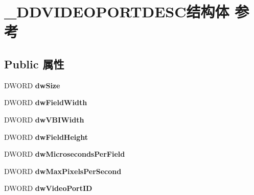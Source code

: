 \hypertarget{struct___d_d_v_i_d_e_o_p_o_r_t_d_e_s_c}{}\section{\+\_\+\+D\+D\+V\+I\+D\+E\+O\+P\+O\+R\+T\+D\+E\+S\+C结构体 参考}
\label{struct___d_d_v_i_d_e_o_p_o_r_t_d_e_s_c}
\subsection*{Public 属性}
\begin{DoxyCompactItemize}
\item 
\mbox{\label{struct___d_d_v_i_d_e_o_p_o_r_t_d_e_s_c_ac59e7cb8099622781997510317090967}} 
D\+W\+O\+RD {\bfseries dw\+Size}
\item 
\mbox{\label{struct___d_d_v_i_d_e_o_p_o_r_t_d_e_s_c_a595eb41cd183ead723af3d286215ecae}} 
D\+W\+O\+RD {\bfseries dw\+Field\+Width}
\item 
\mbox{\label{struct___d_d_v_i_d_e_o_p_o_r_t_d_e_s_c_a688c2db72c38887977ef242b1250432c}} 
D\+W\+O\+RD {\bfseries dw\+V\+B\+I\+Width}
\item 
\mbox{\label{struct___d_d_v_i_d_e_o_p_o_r_t_d_e_s_c_a88f8620f6f0a5478de5e882bf8b4d0b7}} 
D\+W\+O\+RD {\bfseries dw\+Field\+Height}
\item 
\mbox{\label{struct___d_d_v_i_d_e_o_p_o_r_t_d_e_s_c_aad4ed71b4084f495e91a0d44cbbfb12a}} 
D\+W\+O\+RD {\bfseries dw\+Microseconds\+Per\+Field}
\item 
\mbox{\label{struct___d_d_v_i_d_e_o_p_o_r_t_d_e_s_c_aaac1ee5d457bf84eaaaf21c590e08674}} 
D\+W\+O\+RD {\bfseries dw\+Max\+Pixels\+Per\+Second}
\item 
\mbox{\label{struct___d_d_v_i_d_e_o_p_o_r_t_d_e_s_c_a28bf34b8f57dccb916469d9093436da6}} 
D\+W\+O\+RD {\bfseries dw\+Video\+Port\+ID}
\item 

\end{DoxyCompactItemize}
